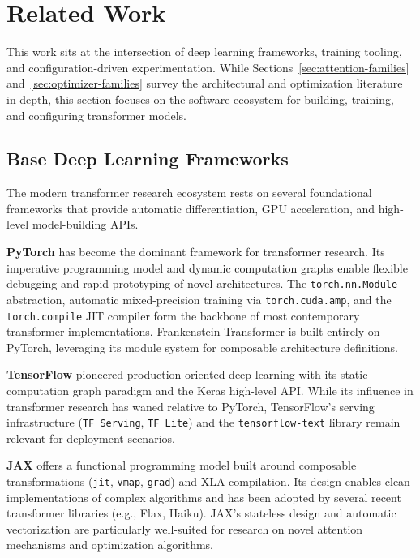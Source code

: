 \section{Related Work}

This work sits at the intersection of deep learning frameworks, training tooling, and configuration-driven experimentation. While Sections~\ref{sec:attention-families} and~\ref{sec:optimizer-families} survey the architectural and optimization literature in depth, this section focuses on the software ecosystem for building, training, and configuring transformer models.

\subsection{Base Deep Learning Frameworks}

The modern transformer research ecosystem rests on several foundational frameworks that provide automatic differentiation, GPU acceleration, and high-level model-building APIs.

\textbf{PyTorch} \citep{paszke_pytorch_2019} has become the dominant framework for transformer research. Its imperative programming model and dynamic computation graphs enable flexible debugging and rapid prototyping of novel architectures. The \texttt{torch.nn.Module} abstraction, automatic mixed-precision training via \texttt{torch.cuda.amp}, and the \texttt{torch.compile} JIT compiler form the backbone of most contemporary transformer implementations. Frankenstein Transformer is built entirely on PyTorch, leveraging its module system for composable architecture definitions.

\textbf{TensorFlow} \citep{abadi_tensorflow_2016} pioneered production-oriented deep learning with its static computation graph paradigm and the Keras high-level API. While its influence in transformer research has waned relative to PyTorch, TensorFlow's serving infrastructure (\texttt{TF Serving}, \texttt{TF Lite}) and the \texttt{tensorflow-text} library remain relevant for deployment scenarios.

\textbf{JAX} \citep{bradbury_jax_2018} offers a functional programming model built around composable transformations (\texttt{jit}, \texttt{vmap}, \texttt{grad}) and XLA compilation. Its design enables clean implementations of complex algorithms and has been adopted by several recent transformer libraries (e.g., Flax, Haiku). JAX's stateless design and automatic vectorization are particularly well-suited for research on novel attention mechanisms and optimization algorithms.

